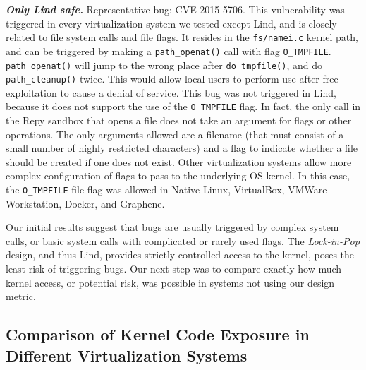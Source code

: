 {{\emph{\textbf{Only Lind safe.}}  Representative bug: CVE-2015-5706. 
This vulnerability was triggered in every virtualization system we tested except Lind, 
and is closely related to file system calls and file flags. It resides in the \texttt{fs/namei.c}
kernel path, and can be triggered by making a \texttt{path\_openat()} 
call with flag \texttt{O\_TMPFILE}. \texttt{path\_openat()} will jump to the wrong
place after \texttt{do\_tmpfile()}, and do \texttt{path\_cleanup()} twice. This would
allow local users to perform use-after-free exploitation to cause a denial of service.
This bug was not triggered in Lind, because it does not support the use of the
\texttt{O\_TMPFILE} flag. In fact, the only call in the Repy sandbox that
opens a file does not take an argument for flags or other operations.  The
only arguments allowed are a filename (that must consist of a small number
of highly restricted characters) and a flag to indicate whether a file should
be created if one does not exist.
Other virtualization systems allow more complex configuration of flags to
pass to the underlying OS kernel.
In this case, the \texttt{O\_TMPFILE} file flag was
allowed in Native Linux, VirtualBox, VMWare Workstation, Docker, and Graphene.

Our initial results %
suggest that bugs are usually triggered by complex system calls, or basic system calls
with complicated or rarely used flags. The \emph{Lock-in-Pop} design, and thus Lind,
provides strictly controlled access to the kernel, poses
the least risk of triggering bugs. Our next step was to compare exactly how
much kernel access, or potential risk, was possible in systems not
using our design metric.


\subsection{Comparison of Kernel Code Exposure in Different Virtualization
Systems}
\label{Reachable-Kernel-Trace-Analysis-for-Different-Virtualization-Systems}

}}
